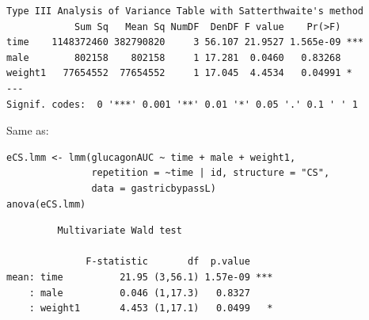 \documentclass[12pt]{article}
\begin{document}
\begin{verbatim}
Type III Analysis of Variance Table with Satterthwaite's method
            Sum Sq   Mean Sq NumDF  DenDF F value    Pr(>F)    
time    1148372460 382790820     3 56.107 21.9527 1.565e-09 ***
male        802158    802158     1 17.281  0.0460   0.83268    
weight1   77654552  77654552     1 17.045  4.4534   0.04991 *  
---
Signif. codes:  0 '***' 0.001 '**' 0.01 '*' 0.05 '.' 0.1 ' ' 1
\end{verbatim}


Same as:
\lstset{language=r,label= ,caption= ,captionpos=b,numbers=none}
\begin{lstlisting}
eCS.lmm <- lmm(glucagonAUC ~ time + male + weight1,
               repetition = ~time | id, structure = "CS",
               data = gastricbypassL)
anova(eCS.lmm) 

\end{lstlisting}

\begin{verbatim}
	     Multivariate Wald test 

              F-statistic       df  p.value    
mean: time          21.95 (3,56.1) 1.57e-09 ***
    : male          0.046 (1,17.3)   0.8327    
    : weight1       4.453 (1,17.1)   0.0499   *
\end{verbatim}
\end{document}
